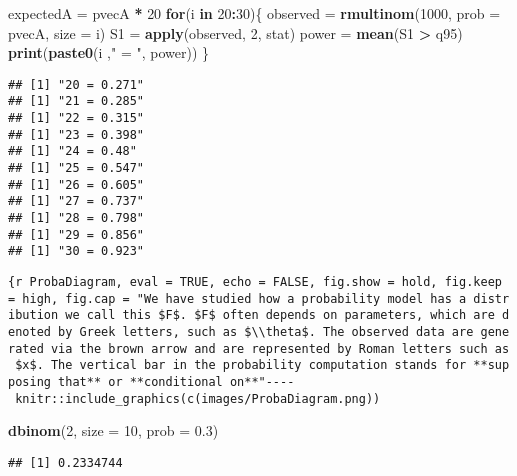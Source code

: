 \documentclass[]{article}
\newenvironment{Shaded}{\begin{snugshade}}{\end{snugshade}}
\newcommand{\KeywordTok}[1]{\textcolor[rgb]{0.13,0.29,0.53}{\textbf{#1}}}
\newcommand{\DataTypeTok}[1]{\textcolor[rgb]{0.13,0.29,0.53}{#1}}
\newcommand{\DecValTok}[1]{\textcolor[rgb]{0.00,0.00,0.81}{#1}}
\newcommand{\FloatTok}[1]{\textcolor[rgb]{0.00,0.00,0.81}{#1}}
\newcommand{\StringTok}[1]{\textcolor[rgb]{0.31,0.60,0.02}{#1}}
\newcommand{\ControlFlowTok}[1]{\textcolor[rgb]{0.13,0.29,0.53}{\textbf{#1}}}
\newcommand{\OperatorTok}[1]{\textcolor[rgb]{0.81,0.36,0.00}{\textbf{#1}}}
\newcommand{\NormalTok}[1]{#1}
\begin{document}
\begin{Shaded}
\begin{Highlighting}[]
\NormalTok{expectedA =}\StringTok{ }\NormalTok{pvecA }\OperatorTok{*}\StringTok{ }\DecValTok{20}
\ControlFlowTok{for}\NormalTok{(i }\ControlFlowTok{in} \DecValTok{20}\OperatorTok{:}\DecValTok{30}\NormalTok{)\{}
\NormalTok{  observed =}\StringTok{ }\KeywordTok{rmultinom}\NormalTok{(}\DecValTok{1000}\NormalTok{, }\DataTypeTok{prob =}\NormalTok{ pvecA, }\DataTypeTok{size =}\NormalTok{ i)}
\NormalTok{  S1 =}\StringTok{ }\KeywordTok{apply}\NormalTok{(observed, }\DecValTok{2}\NormalTok{, stat)}
\NormalTok{  power =}\StringTok{ }\KeywordTok{mean}\NormalTok{(S1 }\OperatorTok{>}\StringTok{ }\NormalTok{q95)}
  \KeywordTok{print}\NormalTok{(}\KeywordTok{paste0}\NormalTok{(i ,}\StringTok{" = "}\NormalTok{, power))}
\NormalTok{\}}
\end{Highlighting}
\end{Shaded}

\begin{verbatim}
## [1] "20 = 0.271"
## [1] "21 = 0.285"
## [1] "22 = 0.315"
## [1] "23 = 0.398"
## [1] "24 = 0.48"
## [1] "25 = 0.547"
## [1] "26 = 0.605"
## [1] "27 = 0.737"
## [1] "28 = 0.798"
## [1] "29 = 0.856"
## [1] "30 = 0.923"
\end{verbatim}

\texttt{\{r\ ProbaDiagram,\ eval\ =\ TRUE,\ echo\ =\ FALSE,\ fig.show\ =\ \textquotesingle{}hold\textquotesingle{},\ fig.keep\ =\ \textquotesingle{}high\textquotesingle{},\ fig.cap\ =\ "We\ have\ studied\ how\ a\ probability\ model\ has\ a\ distribution\ we\ call\ this\ \$F\$.\ \$F\$\ often\ depends\ on\ parameters,\ which\ are\ denoted\ by\ Greek\ letters,\ such\ as\ \$\textbackslash{}\textbackslash{}theta\$.\ The\ observed\ data\ are\ generated\ via\ the\ brown\ arrow\ and\ are\ represented\ by\ Roman\ letters\ such\ as\ \$x\$.\ The\ vertical\ bar\ in\ the\ probability\ computation\ stands\ for\ **supposing\ that**\ or\ **conditional\ on**"-\/-\/-\/-\ knitr::include\_graphics(c(\textquotesingle{}images/ProbaDiagram.png\textquotesingle{}))}

\begin{Shaded}
\begin{Highlighting}[]
\KeywordTok{dbinom}\NormalTok{(}\DecValTok{2}\NormalTok{, }\DataTypeTok{size =} \DecValTok{10}\NormalTok{, }\DataTypeTok{prob =} \FloatTok{0.3}\NormalTok{)}
\end{Highlighting}
\end{Shaded}

\begin{verbatim}
## [1] 0.2334744
\end{verbatim}
\end{document}
